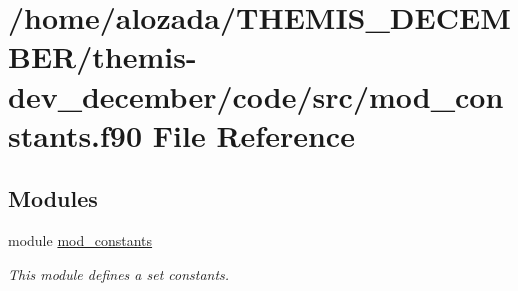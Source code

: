 \hypertarget{mod__constants_8f90}{}\section{/home/alozada/\+T\+H\+E\+M\+I\+S\+\_\+\+D\+E\+C\+E\+M\+B\+E\+R/themis-\/dev\+\_\+december/code/src/mod\+\_\+constants.f90 File Reference}
\label{mod__constants_8f90}
\subsection*{Modules}
\begin{DoxyCompactItemize}
\item 
module \hyperlink{namespacemod__constants}{mod\+\_\+constants}
\begin{DoxyCompactList}\small\item\em This module defines a set constants. \end{DoxyCompactList}\end{DoxyCompactItemize}
